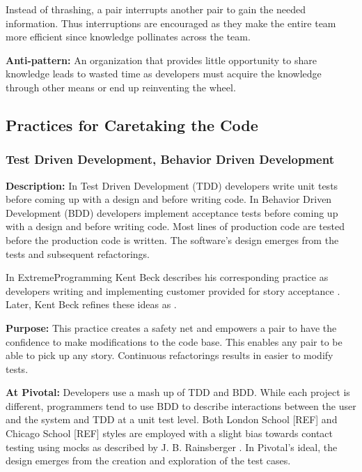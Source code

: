 \begin{table}[]
Instead of thrashing, a pair interrupts another pair to gain the needed information. Thus interruptions are encouraged as they make the entire team more efficient since knowledge pollinates across the team. 

\textbf{Anti-pattern:} An organization that provides little opportunity to share knowledge leads to wasted time as developers must acquire the knowledge through other means or end up reinventing the wheel.
\subsection{Practices for Caretaking the Code}
\subsubsection{Test Driven Development, Behavior Driven Development}
\textbf{Description:} In Test Driven Development (TDD) developers write unit tests before coming up with a design and before writing code. In Behavior Driven Development (BDD) developers implement acceptance tests before coming up with a design and before writing code.  Most lines of production code are tested before the production code is written. The software's design emerges from the tests and subsequent refactorings.

In ExtremeProgramming Kent Beck describes his corresponding  practice as developers writing  and implementing customer provided  for story acceptance \cite{ExtremeProgramming2000}. Later, Kent Beck refines these ideas as  \cite{ExtremeProgramming2004}. 

\textbf{Purpose:} This practice creates a safety net and empowers a pair to have the confidence to make modifications to the code base. This enables any pair to be able to pick up any story. Continuous refactorings results in easier to modify tests.

\textbf{At Pivotal:} Developers use a mash up of TDD and BDD. While each project is different, programmers tend to use BDD to describe interactions between the user and the system and TDD at a unit test level. Both London School [REF] and Chicago School [REF] styles are employed with a slight bias towards contact testing using mocks as described by J. B. Rainsberger \cite{RainsbergerIntegrationTestsYouTube}. In Pivotal's ideal, the design emerges from the creation and exploration of the test cases.  


\end{table}
